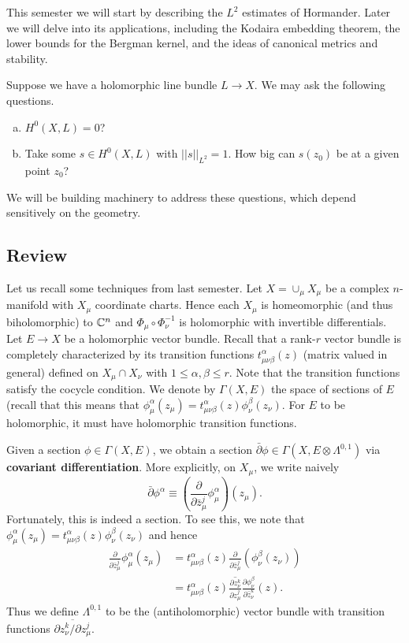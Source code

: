 \documentclass{../mathnotes}
\begin{document}
This semester we will start by describing the $L^2$ estimates of Hormander. Later we will delve into its applications,
including the Kodaira embedding theorem, the lower bounds for the Bergman kernel, and the ideas of canonical metrics
and stability.

\begin{rem}
    Suppose we have a holomorphic line bundle $L\to X$. We may ask the following questions.
    \begin{enumerate}[(a)]
        \item $H^0(X,L)=0$?
        \item Take some $s\in H^0(X,L)$ with $||s||_{L^2}=1$. How big can $s(z_0)$ be at a given point $z_0$?
    \end{enumerate}
    We will be building machinery to address these questions, which depend sensitively on the geometry.
\end{rem}

\subsection{Review}

Let us recall some techniques from last semester. Let $X=\cup_{\mu}X_\mu$ be a complex $n$-manifold with $X_\mu$ coordinate charts.
Hence each $X_\mu$ is homeomorphic (and thus biholomorphic) to $\mathbb{C}^n$ and $\Phi_\mu\circ\Phi_\nu^{-1}$ is holomorphic with invertible differentials.
Let $E\to X$ be a holomorphic vector bundle. Recall that a rank-$r$ vector bundle is completely characterized by its transition functions $t_{\mu\nu\beta}^\alpha(z)$ (matrix valued
in general) defined on $X_\mu\cap X_\nu$ with $1\leq\alpha,\beta\leq r$. Note that the transition functions satisfy the cocycle condition.
We denote by $\Gamma(X,E)$ the space of sections of $E$ (recall that this means that $\phi_\mu^\alpha(z_\mu)=t_{\mu\nu\beta}^\alpha(z)\phi_\nu^\beta(z_\nu)$.
For $E$ to be holomorphic, it must have holomorphic transition functions.

Given a section $\phi\in\Gamma(X,E)$, we obtain a section $\bar\partial\phi\in\Gamma(X,E\otimes\Lambda^{0,1})$ via \textbf{covariant differentiation}.
More explicitly, on $X_\mu$, we write naively
\[\bar\partial\phi^\alpha\equiv\left(\frac{\partial}{\partial \bar z^j_\mu}\phi_{\mu}^\alpha\right)(z_\mu).\]
Fortunately, this is indeed a section. To see this, we note that $\phi^\alpha_\mu(z_\mu)=t_{\mu\nu\beta}^\alpha(z)\phi_\nu^\beta(z_\nu)$ and hence
\begin{align*}
    \frac{\partial}{\partial \bar z^j_\mu}\phi^\alpha_\mu(z_\mu)&=t_{\mu\nu\beta}^\alpha(z)\frac{\partial}{\partial \bar z^j_\mu}\left( \phi_\nu^\beta(z_\nu) \right)\\
    &=t_{\mu\nu\beta}^\alpha(z)\overline{\frac{\partial z_\nu^k}{\partial z_\mu^j}}\frac{\partial \phi^\beta_\nu}{\partial\bar z_\nu^k}(z).
\end{align*}
Thus we define $\Lambda^{0,1}$ to be the (antiholomorphic) vector bundle with transition functions $\overline{\partial z_\nu^k/\partial z^j_\mu}$.
\end{document}
